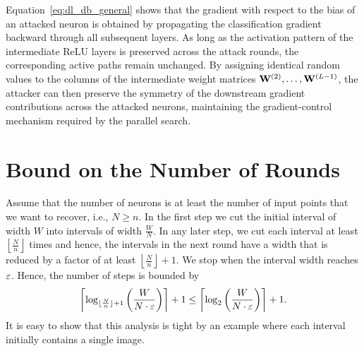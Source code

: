 Equation~\eqref{eq:dl_db_general} shows that the gradient with respect to the bias of an attacked neuron is obtained by propagating the classification gradient backward through all subsequent layers. As long as the activation pattern of the intermediate ReLU layers is preserved across the attack rounds, the corresponding active paths remain unchanged. By assigning identical random values to the columns of the intermediate weight matrices $\mathbf{W}^{(2)},\ldots,\mathbf{W}^{(L-1)}$, the attacker can then preserve the symmetry of the downstream gradient contributions across the attacked neurons, maintaining the gradient-control mechanism required by the parallel search.

\section{Bound on the Number of Rounds} \label{app:bound_on_rounds}
Assume that the number of neurons is at least the number of input points that we want to recover, i.e., $N \geq n$.
In the first step we cut the initial interval of width $W$ into intervals of width $\frac{W}{N}$.
In any later step, we cut each interval at least $\left\lfloor \frac{N}{n} \right\rfloor$ times and hence, the intervals in the next round have a width that is reduced by a factor of at least $\left\lfloor \frac{N}{n} \right\rfloor + 1$.
We stop when the interval width reaches $\varepsilon$.
Hence, the number of steps is bounded by
\begin{equation}\label{eq:bound_rounds}
\left\lceil \log_{\lfloor \frac{N}{n} \rfloor + 1} \left( \frac{W}{N \cdot \varepsilon} \right) \right\rceil + 1 \leq \left\lceil\log_2 \left( \frac{W}{N \cdot \varepsilon} \right) \right\rceil + 1.
\end{equation}
It is easy to show that this analysis is tight by an example where each interval initially contains a single image.




